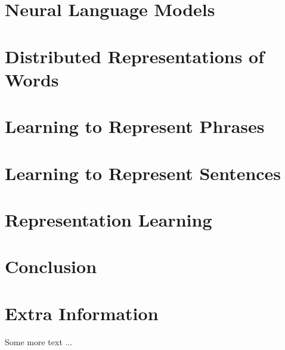 \documentclass[withindex,glossary]{cam-thesis}
\begin{document}
\chapter{Neural Language Models}

\chapter{Distributed Representations of Words}

\chapter{Learning to Represent Phrases}

\chapter{Learning to Represent Sentences}

\chapter{Representation Learning}

\chapter{Conclusion}



\cleardoublepage
{}
{}






\appendix

\chapter{Extra Information}
Some more text ...



\printthesisindex
\end{document}
